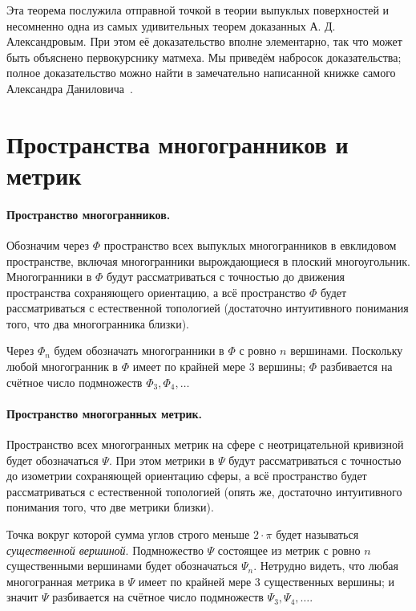 \documentclass[oneside,a4paper]{article}
\begin{document}
Эта теорема 
послужила отправной точкой в теории выпуклых поверхностей 
и несомненно одна из самых удивительных теорем доказанных А. Д. Александровым.
При этом её доказательство вполне элементарно, так что может быть объяснено первокурснику матмеха.
Мы приведём набросок доказательства; полное доказательство можно найти в замечательно написанной книжке самого Александра Даниловича~\cite{alexandrov}.


\section{Пространства многогранников и метрик}

\paragraph{Пространство многогранников.}
Обозначим через $\Phi$ пространство всех выпуклых многогранников в евклидовом пространстве, включая многогранники вырождающиеся в плоский многоугольник.
Многогранники в $\Phi$ будут рассматриваться с точностью до движения пространства сохраняющего ориентацию, а всё пространство $\Phi$ будет рассматриваться с естественной топологией (достаточно интуитивного понимания того, что два многогранника близки).

Через $\Phi_n$ будем обозначать многогранники в $\Phi$ с ровно $n$ вершинами.
Поскольку любой многогранник в $\Phi$ имеет по крайней мере 3 вершины;
$\Phi$ разбивается на счётное число подмножеств $\Phi_3,\Phi_4,\dots$

\paragraph{Пространство многогранных метрик.}
Пространство всех многогранных метрик на сфере с неотрицательной кривизной будет обозначаться $\Psi$.
При этом метрики в $\Psi$ будут рассматриваться с точностью до изометрии сохраняющей ориентацию сферы, а всё пространство будет рассматриваться с естественной топологией (опять же, достаточно интуитивного понимания того, что две метрики близки).

Точка вокруг которой сумма углов строго меньше $2\cdot\pi$ будет называться \emph{существенной вершиной}.
Подмножество $\Psi$ состоящее из метрик с ровно $n$ существенными вершинами будет обозначаться $\Psi_n$.
Нетрудно видеть, что любая многогранная метрика в $\Psi$ имеет по крайней мере 3 существенных вершины;
и значит $\Psi$ разбивается на счётное число подмножеств $\Psi_3,\Psi_4,\dots$.
\end{document}
